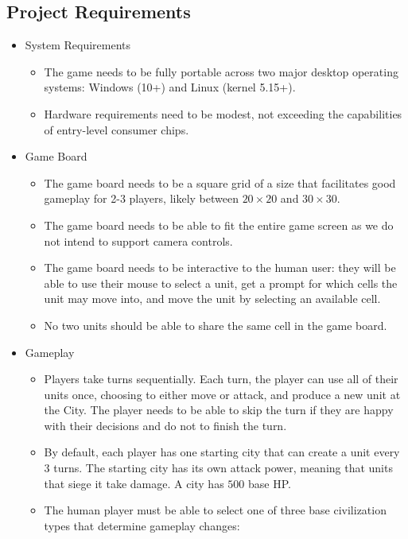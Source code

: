 \documentclass[11pt]{amsart}
\begin{document}
\newpage
\subsection*{Project Requirements} \phantom{}
\begin{itemize}
    \item System Requirements
    \begin{itemize}
        \item The game needs to be fully portable across two major desktop operating systems: Windows (10+) and Linux (kernel 5.15+).
        \item Hardware requirements need to be modest, not exceeding the capabilities of entry-level consumer chips.
    \end{itemize}
    \item Game Board
    \begin{itemize}
        \item The game board needs to be a square grid of a size that facilitates good gameplay for 2-3 players, likely between $20 \times 20$ and $30 \times 30$.
        \item The game board needs to be able to fit the entire game screen as we do not intend to support camera controls.
        \item The game board needs to be interactive to the human user: they will be able to use their mouse to select a unit, get a prompt for which cells the unit may move into, and move the unit by selecting an available cell.
        \item No two units should be able to share the same cell in the game board.
    \end{itemize}
    \item Gameplay
    \begin{itemize}
        \item Players take turns sequentially. Each turn, the player can use all of their units once, choosing to either move or attack, and produce a new unit at the City. The player needs to be able to skip the turn if they are happy with their decisions and do not to finish the turn.
        \item By default, each player has one starting city that can create a unit every 3 turns. The starting city has its own attack power, meaning that units that siege it take damage. A city has $500$ base HP.
        \item The human player must be able to select one of three base civilization types that determine gameplay changes:
        \begin{itemize}

\end{itemize}
\end{itemize}
\end{itemize}
\end{document}
